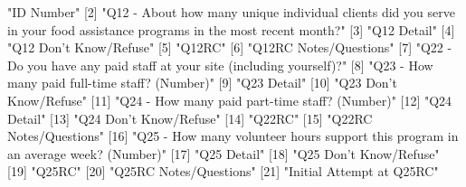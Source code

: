 \documentclass[11pt]{article}
\begin{document}
\begin{Schunk}
\begin{Soutput}
 [1] "ID Number"                                                                                                              
 [2] "Q12 - About how many unique individual clients did you serve in your food assistance programs in the most recent month?"
 [3] "Q12 Detail"                                                                                                             
 [4] "Q12 Don't Know/Refuse"                                                                                                  
 [5] "Q12RC"                                                                                                                  
 [6] "Q12RC Notes/Questions"                                                                                                  
 [7] "Q22 - Do you have any paid staff at your site (including yourself)?"                                                    
 [8] "Q23 - How many paid full-time staff?  (Number)"                                                                         
 [9] "Q23 Detail"                                                                                                             
[10] "Q23 Don't Know/Refuse"                                                                                                  
[11] "Q24 - How many paid part-time staff?  (Number)"                                                                         
[12] "Q24 Detail"                                                                                                             
[13] "Q24 Don't Know/Refuse"                                                                                                  
[14] "Q22RC"                                                                                                                  
[15] "Q22RC Notes/Questions"                                                                                                  
[16] "Q25 - How many volunteer hours support this program in an average week? (Number)"                                       
[17] "Q25 Detail"                                                                                                             
[18] "Q25 Don't Know/Refuse"                                                                                                  
[19] "Q25RC"                                                                                                                  
[20] "Q25RC Notes/Questions"                                                                                                  
[21] "Initial Attempt at Q25RC"                                                                                               
\end{Soutput}
\end{Schunk}
\end{document}

